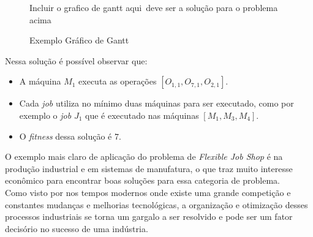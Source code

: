 \begin{figure}[ht]
    \centering
    \small{Incluir o grafico de gantt aqui\ deve ser a solução para o problema acima}
    \caption{Exemplo Gráfico de Gantt}
    \label{fig:plot-gantt}
\end{figure}
            
\noindent Nessa solução é possível observar que:
\begin{itemize}
    \item A máquina $M_1$ executa as operações $[O_{1,1}, O_{7,1}, O_{2,1}]$.
    \item Cada \textit{job} utiliza no mínimo duas máquinas para ser executado, como por exemplo o \textit{job} $J_1$ que é executado nas máquinas $[M_1 , M_3, M_4]$.
    \item O \textit{fitness} dessa solução é $7$.
\end{itemize}
\indent O exemplo mais claro de aplicação do problema de \textit{Flexible Job Shop} é na produção industrial e em sistemas de manufatura, o que traz muito interesse econômico para encontrar boas soluções para essa categoria de problema.\\
%
\indent Como visto por \cite{Wari2016} nos tempos modernos onde existe uma grande competição e constantes mudanças e melhorias tecnológicas, a organização e otimização desses processos industriais se torna um gargalo a ser resolvido e pode ser um fator decisório no sucesso de uma indústria.






